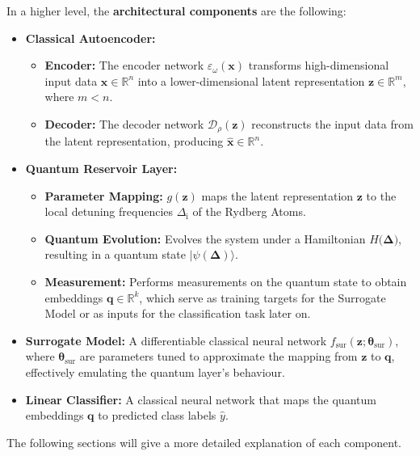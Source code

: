 \documentclass[conference]{IEEEtran}
\begin{document}
In a higher level, the \textbf{architectural components} are the following:
\begin{itemize}
    \item \textbf{Classical Autoencoder:}
        \begin{itemize}
            \item \textbf{Encoder:}
            The encoder network \(\varepsilon_\omega(\mathbf{x})\)
            transforms high-dimensional input data \(\mathbf{x} \in \mathbb{R}^{n}\) into 
            a lower-dimensional latent representation \(\mathbf{z} \in \mathbb{R}^m\), 
            where \(m < n\).
            \item \textbf{Decoder:}
            The decoder network \(\mathcal{D}_\rho(\mathbf{z})\)
            reconstructs the input data from the latent representation, producing
            \(\mathbf{\hat{x}} \in \mathbb{R}^{n}\).
        \end{itemize}

    \item \textbf{Quantum Reservoir Layer:}
        \begin{itemize}
            \item \textbf{Parameter Mapping:}
            \(g(\mathbf{z})\) maps the latent representation \(\mathbf{z}\) to the local detuning frequencies
            \(\Delta_{\mathrm{i}}\) of the Rydberg Atoms.
            \item \textbf{Quantum Evolution:}
            Evolves the system under a Hamiltonian \(H(\mathbf{\Delta)}\), resulting in a quantum 
            state \(|\psi(\mathbf{\Delta})\rangle\).
            \item \textbf{Measurement:}
            Performs measurements on the quantum state to obtain embeddings \(\mathbf{q} \in \mathbb{R}^k\), which serve as training targets for the Surrogate Model or as 
            inputs for the classification task later on.
        \end{itemize}

    \item \textbf{Surrogate Model:}
    A differentiable classical neural network \( f_{\text{sur}}(\mathbf{z}; \bm{\theta}_{\text{sur}}) \),
    where \(\bm{\theta}_{\text{sur}}\) are parameters tuned to approximate the 
    mapping from \(\mathbf{z}\) to \(\mathbf{q}\), effectively emulating
    the quantum layer's behaviour.

    \item \textbf{Linear Classifier:}
    A classical neural network that maps the quantum embeddings \(\mathbf{q}\) to 
    predicted class labels \(\hat{y}\).

\end{itemize}
The following sections will give a more detailed explanation of each 
component.
\end{document}
